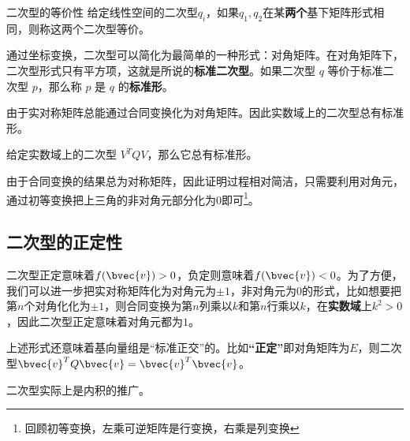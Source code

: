 \begin{definition}{二次型的等价性}
给定线性空间的二次型$q_i$，如果$q_1,q_2$在某\textbf{两个}基下矩阵形式相同，则称这两个二次型等价。
\end{definition}

通过坐标变换，二次型可以简化为最简单的一种形式：对角矩阵。在对角矩阵下，二次型形式只有平方项，这就是所说的\textbf{标准二次型}。如果二次型 $q$
等价于标准二次型 $p$，那么称 $p$ 是 $q$ 的\textbf{标准形}。

由于实对称矩阵总能通过合同变换化为对角矩阵。因此实数域上的二次型总有标准形。
\begin{theorem}{}
给定实数域上的二次型 $V^T QV$，那么它总有标准形。
\end{theorem}
由于合同变换的结果总为对称矩阵，因此证明过程相对简洁，只需要利用对角元，通过初等变换把上三角的非对角元部分化为0即可\footnote{回顾初等变换，左乘可逆矩阵是行变换，右乘是列变换}。
\subsection{二次型的正定性}
二次型正定意味着$f(\bvec{v})>0$，负定则意味着$f(\bvec{v})< 0$。为了方便，我们可以进一步把实对称矩阵化为对角元为$\pm 1$，非对角元为$0$的形式，比如想要把第$n$个对角化化为$\pm 1$，则合同变换为第$n$列乘以$k$和第$n$行乘以$k$，在\textbf{实数域}上$k^2>0$，因此二次型正定意味着对角元都为$1$。

上述形式还意味着基向量组是“标准正交”的。比如\textbf{“正定”}即对角矩阵为$E$，则二次型$\bvec{v}^{T}Q\bvec{v}=\bvec{v}^{T}\bvec{v}$。

二次型实际上是内积的推广。

